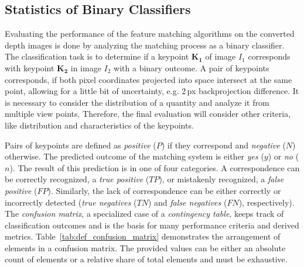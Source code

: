 \subsection{Statistics of Binary Classifiers}\label{sec:statistic_classifier}

Evaluating the performance of the feature matching algorithms on the converted depth images is done by analyzing the matching process as a binary classifier.
The classification task is to determine if a keypoint $\mathbf{K_1}$ of image $I_1$ corresponds with keypoint $\mathbf{K_2}$ in image $I_2$ with a binary outcome.
A pair of keypoints corresponds, if both pixel coordinates projected into space intersect at the same point, allowing for a little bit of uncertainty, e.g. 2\,px backprojection difference.
It is necessary to consider the distribution of a quantity and analyze it from multiple view points.
Therefore, the final evaluation will consider other criteria, like distribution and characteristics of the keypoints.

Pairs of keypoints are defined as \emph{positive} ($P$) if they correspond and \emph{negative} ($N$) otherwise.
The predicted outcome of the matching system is either \emph{yes} ($y$) or \emph{no} ($n$).
The result of this prediction is in one of four categories.
A correspondence can be correctly recognized, a \emph{true positive} ($TP$), or mistakenly recognized, a \emph{false positive} ($FP$).
Similarly, the lack of correspondence can be either correctly or incorrectly detected (\emph{true negatives} ($TN$) and \emph{false negatives} ($FN$), respectively).
The \emph{confusion matrix}, a specialized case of a \emph{contingency table}\cite[p.21]{agresti_2007}, keeps track of classification outcomes and is the basis for many performance criteria and derived metrics.
Table~\ref{tab:def_confusion_matrix} demonstrates the arrangement of elements in a confusion matrix.
The provided values can be either an absolute count of elements or a relative share of total elements and must be exhaustive.

